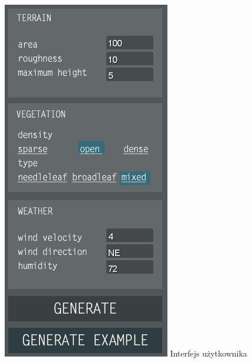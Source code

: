 \documentclass[a4paper, 11pt]{article}
\begin{document}
	\noindent\begin{minipage}{0.4\textwidth}%
		\includegraphics[width=\linewidth]{GUI}
		Interfejs użytkownika
	\end{minipage}%
\end{document}
